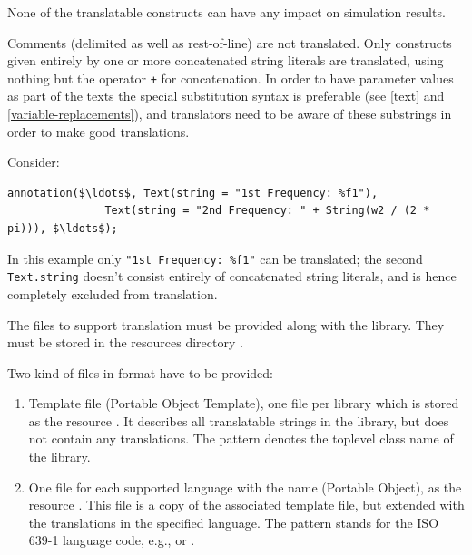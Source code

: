 \begin{nonnormative}
None of the translatable constructs can have any impact on simulation results.
\end{nonnormative}

Comments (delimited as well as rest-of-line) are not translated.
Only constructs given entirely by one or more concatenated string literals are translated, using nothing but the operator \lstinline!+! for concatenation.
In order to have parameter values as part of the texts the special substitution syntax is preferable (see \cref{text} and \cref{variable-replacements}), and translators need to be aware of these substrings in order to make good translations.

\begin{example}
Consider:
\begin{lstlisting}[language=modelica]
annotation($\ldots$, Text(string = "1st Frequency: %f1"),
               Text(string = "2nd Frequency: " + String(w2 / (2 * pi))), $\ldots$);
\end{lstlisting}
In this example only \lstinline!"1st Frequency: %f1"! can be translated; the second \lstinline!Text.string! doesn't consist entirely of concatenated string literals, and is hence completely excluded from translation.
\end{example}

The files to support translation must be provided along with the library.
They must be stored in the resources directory .

Two kind of files in \textcite{GettextManual} format have to be provided:
\begin{enumerate}
\item Template file  (Portable Object Template), one file per library which is stored as the resource .
It describes all translatable strings in the library, but does not contain any translations.
The pattern  denotes the toplevel class name of the library.
\item One file for each supported language with the name  (Portable Object), as the resource .
This file is a copy of the associated template file, but extended with the translations in the specified language.
The pattern  stands for the ISO 639-1 language code, e.g.,  or .
\end{enumerate}

